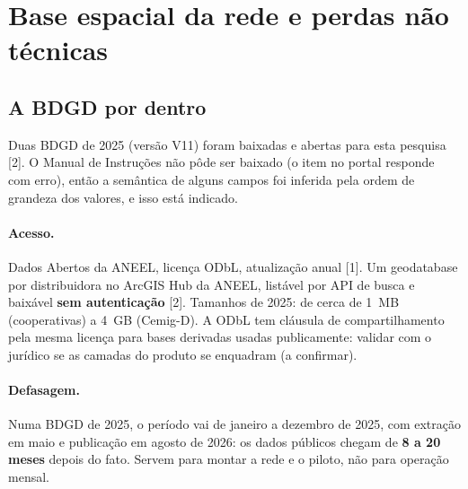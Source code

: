 
\section{Base espacial da rede e perdas não técnicas}

\subsection*{A BDGD por dentro}

Duas BDGD de 2025 (versão V11) foram baixadas e abertas para esta pesquisa
[2]. O Manual de Instruções não pôde ser baixado (o item no portal responde
com erro), então a semântica de alguns campos foi inferida pela ordem de
grandeza dos valores, e isso está indicado.

\paragraph{Acesso.} Dados Abertos da ANEEL, licença ODbL, atualização anual
[1]. Um geodatabase por distribuidora no ArcGIS Hub da ANEEL, listável por
API de busca e baixável \textbf{sem autenticação} [2]. Tamanhos de 2025: de
cerca de 1~MB (cooperativas) a 4~GB (Cemig-D). A ODbL tem cláusula de
compartilhamento pela mesma licença para bases derivadas usadas publicamente:
validar com o jurídico se as camadas do produto se enquadram (a confirmar).

\paragraph{Defasagem.} Numa BDGD de 2025, o período vai de janeiro a
dezembro de 2025, com extração em maio e publicação em agosto de 2026: os
dados públicos chegam de \textbf{8 a 20 meses} depois do fato. Servem para
montar a rede e o piloto, não para operação mensal.

